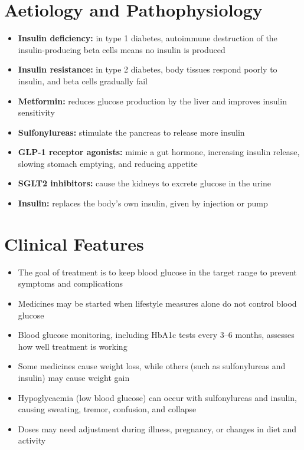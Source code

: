 \section*{Aetiology and Pathophysiology}
\begin{itemize}
    \item \textbf{Insulin deficiency:} in type 1 diabetes, autoimmune destruction of the insulin-producing beta cells means no insulin is produced
    \item \textbf{Insulin resistance:} in type 2 diabetes, body tissues respond poorly to insulin, and beta cells gradually fail
    \item \textbf{Metformin:} reduces glucose production by the liver and improves insulin sensitivity
    \item \textbf{Sulfonylureas:} stimulate the pancreas to release more insulin
    \item \textbf{GLP-1 receptor agonists:} mimic a gut hormone, increasing insulin release, slowing stomach emptying, and reducing appetite
    \item \textbf{SGLT2 inhibitors:} cause the kidneys to excrete glucose in the urine
    \item \textbf{Insulin:} replaces the body's own insulin, given by injection or pump
\end{itemize}

\section*{Clinical Features}
\begin{itemize}
    \item The goal of treatment is to keep blood glucose in the target range to prevent symptoms and complications
    \item Medicines may be started when lifestyle measures alone do not control blood glucose
    \item Blood glucose monitoring, including HbA1c tests every 3--6 months, assesses how well treatment is working
    \item Some medicines cause weight loss, while others (such as sulfonylureas and insulin) may cause weight gain
    \item Hypoglycaemia (low blood glucose) can occur with sulfonylureas and insulin, causing sweating, tremor, confusion, and collapse
    \item Doses may need adjustment during illness, pregnancy, or changes in diet and activity
\end{itemize}

